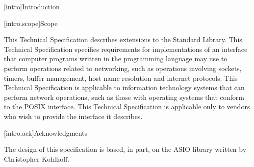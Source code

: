 
[intro]{Introduction}

[intro.scope]{Scope}

\pnum
 This Technical Specification describes extensions to the \Cpp Standard Library. This Technical Specification specifies requirements for implementations of an interface that computer programs written in the \Cpp programming language may use to perform operations related to networking, such as operations involving sockets, timers, buffer management, host name resolution and internet protocols. This Technical Specification is applicable to information technology systems that can perform network operations, such as those with operating systems that conform to the POSIX interface. This Technical Specification is applicable only to vendors who wish to provide the interface it describes.


[intro.ack]{Acknowledgments}

\pnum
The design of this specification is based, in part, on the ASIO library
written by Christopher Kohlhoff.


